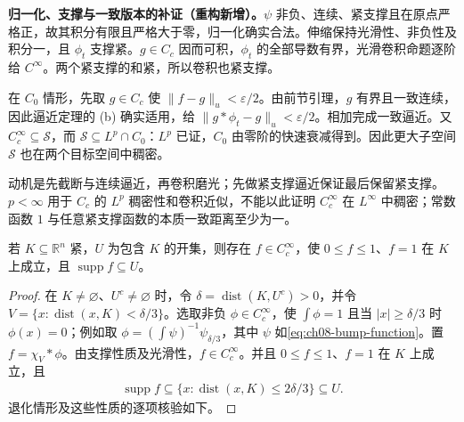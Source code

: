 \documentclass[../../main.tex]{subfiles}
\begin{document}
\begin{remark}
\textbf{归一化、支撑与一致版本的补证（重构新增）。}$\psi$ 非负、连续、紧支撑且在原点严格正，故其积分有限且严格大于零，归一化确实合法。伸缩保持光滑性、非负性及积分一，且 $\phi_t$ 支撑紧。$g\in C_c$ 因而可积，$\phi_t$ 的全部导数有界，光滑卷积命题逐阶给 $C^\infty$。两个紧支撑的和紧，所以卷积也紧支撑。

在 $C_0$ 情形，先取 $g\in C_c$ 使 $\|f-g\|_u<\varepsilon/2$。由前节引理，$g$ 有界且一致连续，因此逼近定理的 (b) 确实适用，给 $\|g*\phi_t-g\|_u<\varepsilon/2$。相加完成一致逼近。又 $C_c^\infty\subseteq\mathcal S$，而 $\mathcal S\subseteq L^p\cap C_0$：$L^p$ 已证，$C_0$ 由零阶的快速衰减得到。因此更大子空间 $\mathcal S$ 也在两个目标空间中稠密。

动机是先截断与连续逼近，再卷积磨光；先做紧支撑逼近保证最后保留紧支撑。$p<\infty$ 用于 $C_c$ 的 $L^p$ 稠密性和卷积近似，不能以此证明 $C_c^\infty$ 在 $L^\infty$ 中稠密；常数函数 $1$ 与任意紧支撑函数的本质一致距离至少为一。
\end{remark}
\begin{proposition}\label{proposition:ch08-smooth-cutoff}
若 $K\subseteq\mathbb R^n$ 紧，$U$ 为包含 $K$ 的开集，则存在 $f\in C_c^\infty$，使 $0\leqslant f\leqslant1$、$f=1$ 在 $K$ 上成立，且 $\operatorname{supp}f\subseteq U$。
\end{proposition}
\begin{proof}
在 $K\ne\varnothing$、$U^c\ne\varnothing$ 时，令 $\delta=\operatorname{dist}(K,U^c)>0$，并令 $V=\{x:\operatorname{dist}(x,K)<\delta/3\}$。选取非负 $\phi\in C_c^\infty$，使 $\int\phi=1$ 且当 $|x|\geqslant\delta/3$ 时 $\phi(x)=0$；例如取
$\phi=(\int\psi)^{-1}\psi_{\delta/3}$，其中 $\psi$ 如\cref{eq:ch08-bump-function}。置 $f=\chi_V*\phi$。由支撑性质及光滑性，$f\in C_c^\infty$。并且 $0\leqslant f\leqslant1$、$f=1$ 在 $K$ 上成立，且
\begin{align*}
\operatorname{supp}f\subseteq
\{x:\operatorname{dist}(x,K)\leqslant2\delta/3\}\subseteq U.
\end{align*}
退化情形及这些性质的逐项核验如下。
\end{proof}
\end{document}
